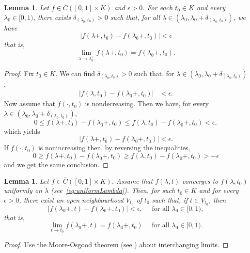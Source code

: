 \documentclass{amsart}
\newtheorem{lemma}[theorem]{Lemma}
\begin{document}
\begin{lemma}\label{lem:rightL1}
Let $f\in \overline{C}([0,1]\times K)$  and $\epsilon>0$.
For each $t_0\in K$ and every $\lambda_0\in[0,1)$, there exists
$\delta_{(\lambda_0,t_0)}>0$ such that, for all
$\lambda\in (\lambda_0,\lambda_0+\delta_{(\lambda_0,t_0)})$, we have
$$|f(\lambda+,t_0)-f(\lambda_0+,t_0)|<\epsilon$$
that is, $$\lim_{\lambda\to\lambda_0^+} f(\lambda+,t_0)=f(\lambda_0+,t_0).$$

\end{lemma}
\begin{proof}
Fix $t_0\in K$. We can find $\delta_{(\lambda_0,t_0)}>0$ such that,
for $\lambda\in (\lambda_0,\lambda_0+\delta_{(\lambda_0,t_0)})$,
\begin{align}
|f(\lambda,t_0)-f(\lambda_0+,t_0)|&<\epsilon.
\end{align}
Now assume that $f(\cdot,t_0)$ is nondecreasing. Then we have,
for every $\lambda\in (\lambda_0,\lambda_0+\delta_{(\lambda_0,t_0)})$,
$$0\leq f(\lambda+,t_0)-f(\lambda_0+,t_0)\leq f(\lambda,t_0)-f(\lambda_0+,t_0)<\epsilon,$$
which yields $$|f(\lambda+,t_0)-f(\lambda_0+,t_0)|<\epsilon.$$
If $f(\cdot,t_0)$ is nonincreasing then, by reversing the inequalities,
$$0\geq f(\lambda+,t_0)-f(\lambda_0+,t_0)\geq f(\lambda,t_0)-f(\lambda_0+,t_0)>-\epsilon$$
and we get the same conclusion.
\end{proof}
\begin{lemma}\label{lem:rightL2}
Let $f\in \overline{C}([0,1]\times K)$.  Assume that $f(\lambda, t)$ converges to  $f(\lambda, t_0)$ uniformly on $\lambda$ (see~\eqref{eq:uniformLambda}).
Then, for such $t_0\in K$ and for every $\epsilon>0$, there exist an open neighbourhood $V_{t_0}$ of $t_0$ such that, if $t\in V_{t_0}$, then
$$|f(\lambda_0+,t)-f(\lambda_0+,t_0)|<\epsilon, \quad\text{ for all  $\lambda_0\in[0,1)$}, $$
that is, $$\lim_{t\to t_0} f(\lambda_0+,t)=f(\lambda_0+,t_0) \quad\text{ for all  $\lambda_0\in[0,1)$}.$$
\end{lemma}
\begin{proof}

 Use the  Moore-Osgood theorem (see \cite[Chapter~VII, Theorem~2]{Graves:1946}) about interchanging limits.
\end{proof}
\end{document}
